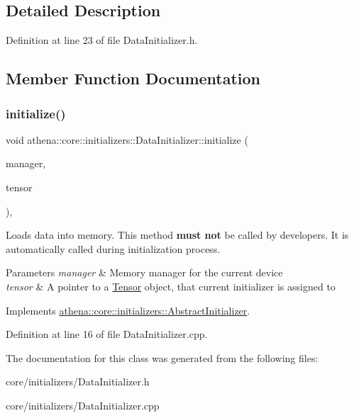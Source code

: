 \subsection{Detailed Description}


Definition at line 23 of file Data\+Initializer.\+h.



\subsection{Member Function Documentation}
\mbox{\label{classathena_1_1core_1_1initializers_1_1_data_initializer_a984213526b2741e423f230098c71520a}} 
\subsubsection{\texorpdfstring{initialize()}{initialize()}}
{\footnotesize\ttfamily void athena\+::core\+::initializers\+::\+Data\+Initializer\+::initialize (\begin{DoxyParamCaption}\item[{\mbox{\hyperlink{classathena_1_1backend_1_1_abstract_memory_manager}{athena\+::backend\+::\+Abstract\+Memory\+Manager}} $\ast$}]{manager,  }\item[{\mbox{\hyperlink{classathena_1_1core_1_1_tensor}{Tensor}} $\ast$}]{tensor }\end{DoxyParamCaption})\hspace{0.3cm}{\ttfamily [override]}, {\ttfamily [virtual]}}

Loads data into memory. This method {\bfseries must not} be called by developers. It is automatically called during initialization process. 
\begin{DoxyParams}{Parameters}
{\em manager} & Memory manager for the current device \\
\hline
{\em tensor} & A pointer to a \mbox{\hyperlink{classathena_1_1core_1_1_tensor}{Tensor}} object, that current initializer is assigned to \\
\hline
\end{DoxyParams}


Implements \mbox{\hyperlink{classathena_1_1core_1_1initializers_1_1_abstract_initializer_a9c0f0c57add306c9da8ffe8797532f62}{athena\+::core\+::initializers\+::\+Abstract\+Initializer}}.



Definition at line 16 of file Data\+Initializer.\+cpp.



The documentation for this class was generated from the following files\+:\begin{DoxyCompactItemize}
\item 
core/initializers/Data\+Initializer.\+h\item 
core/initializers/Data\+Initializer.\+cpp\end{DoxyCompactItemize}
